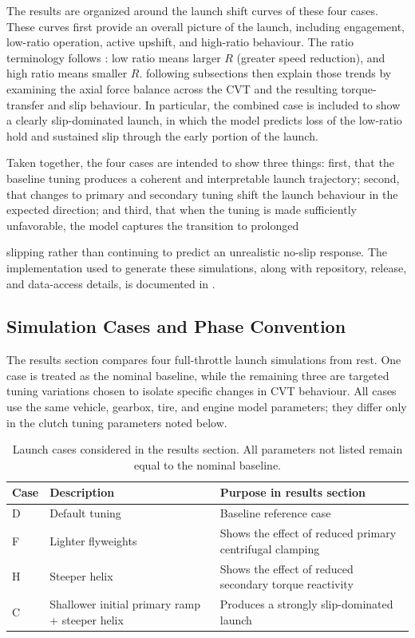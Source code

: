 \documentclass[11pt]{article}
\numberwithin{equation}{section}
\begin{document}
The results are organized around the launch shift curves of these four cases.
These curves first provide an overall picture of the launch, including
engagement, low-ratio operation, active upshift, and high-ratio behaviour. The
ratio terminology follows : low ratio means larger $R$
(greater speed reduction), and high ratio means smaller $R$.
following subsections then explain those trends by examining the axial force
balance across the CVT and the resulting torque-transfer and slip behaviour. In
particular, the combined case is included to show a clearly slip-dominated
launch, in which the model predicts loss of the low-ratio hold and sustained
slip through the early portion of the launch.

Taken together, the four cases are intended to show three things: first, that
the baseline tuning produces a coherent and interpretable launch trajectory;
second, that changes to primary and secondary tuning shift the launch behaviour
in the expected direction; and third, that when the tuning is made
sufficiently unfavorable, the model captures the transition to prolonged

slipping rather than continuing to predict an unrealistic no-slip response.
The implementation used to generate these simulations, along with repository,
release, and data-access details, is documented in
.

\subsection{Simulation Cases and Phase Convention}
\label{sec:results_setup}

The results section compares four full-throttle launch simulations from rest.
One case is treated as the nominal baseline, while the remaining three are
targeted tuning variations chosen to isolate specific changes in CVT behaviour.
All cases use the same vehicle, gearbox, tire, and engine model parameters;
they differ only in the clutch tuning parameters noted below.

\begin{table}[H]
\centering
\caption{Launch cases considered in the results section. All parameters not listed remain equal to the nominal baseline.}
\label{tab:results_cases}
\small
\begin{tabular}{@{}lll@{}}
\toprule
\textbf{Case} & \textbf{Description} & \textbf{Purpose in results section} \\
\midrule
D & Default tuning & Baseline reference case \\
F & Lighter flyweights & Shows the effect of reduced primary centrifugal clamping \\
H & Steeper helix & Shows the effect of reduced secondary torque reactivity \\
C & Shallower initial primary ramp + steeper helix & Produces a strongly slip-dominated launch \\
\bottomrule
\end{tabular}
\end{table}
\end{document}
